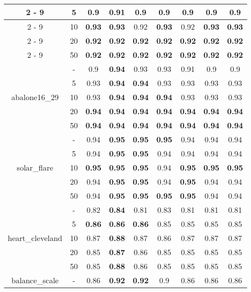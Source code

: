 \documentclass{article}%
\begin{document}
\begin{longtable}{c|c|ccccccc}
\cline{2%
-%
9}%
&5&0.9&\textbf{0.91}&0.9&0.9&0.9&0.9&0.9\\%
\cline{2%
-%
9}%
&10&\textbf{0.93}&\textbf{0.93}&0.92&\textbf{0.93}&0.92&\textbf{0.93}&\textbf{0.93}\\%
\cline{2%
-%
9}%
&20&\textbf{0.92}&\textbf{0.92}&\textbf{0.92}&\textbf{0.92}&\textbf{0.92}&\textbf{0.92}&\textbf{0.92}\\%
\cline{2%
-%
9}%
&50&\textbf{0.92}&\textbf{0.92}&\textbf{0.92}&\textbf{0.92}&\textbf{0.92}&\textbf{0.92}&\textbf{0.92}\\%
\hline%
\multirow{5}{*}{abalone16\_29}&{-}&0.9&\textbf{0.94}&0.93&0.93&0.91&0.9&0.9\\%
\cline{2%
-%
9}%
&5&0.93&\textbf{0.94}&\textbf{0.94}&0.93&0.93&0.93&0.93\\%
\cline{2%
-%
9}%
&10&0.93&\textbf{0.94}&\textbf{0.94}&\textbf{0.94}&0.93&0.93&0.93\\%
\cline{2%
-%
9}%
&20&\textbf{0.94}&\textbf{0.94}&\textbf{0.94}&\textbf{0.94}&\textbf{0.94}&\textbf{0.94}&\textbf{0.94}\\%
\cline{2%
-%
9}%
&50&\textbf{0.94}&\textbf{0.94}&\textbf{0.94}&\textbf{0.94}&\textbf{0.94}&\textbf{0.94}&\textbf{0.94}\\%
\hline%
\multirow{5}{*}{solar\_flare}&{-}&0.94&\textbf{0.95}&\textbf{0.95}&\textbf{0.95}&0.94&0.94&0.94\\%
\cline{2%
-%
9}%
&5&0.94&\textbf{0.95}&\textbf{0.95}&0.94&0.94&0.94&0.94\\%
\cline{2%
-%
9}%
&10&\textbf{0.95}&\textbf{0.95}&\textbf{0.95}&0.94&\textbf{0.95}&\textbf{0.95}&\textbf{0.95}\\%
\cline{2%
-%
9}%
&20&0.94&\textbf{0.95}&\textbf{0.95}&0.94&\textbf{0.95}&0.94&0.94\\%
\cline{2%
-%
9}%
&50&0.94&\textbf{0.95}&\textbf{0.95}&\textbf{0.95}&\textbf{0.95}&0.94&0.94\\%
\hline%
\multirow{5}{*}{heart\_cleveland}&{-}&0.82&\textbf{0.84}&0.81&0.83&0.81&0.81&0.81\\%
\cline{2%
-%
9}%
&5&\textbf{0.86}&\textbf{0.86}&\textbf{0.86}&0.85&0.85&0.85&0.85\\%
\cline{2%
-%
9}%
&10&0.87&\textbf{0.88}&0.87&0.86&0.87&0.87&0.87\\%
\cline{2%
-%
9}%
&20&0.85&\textbf{0.87}&0.86&0.85&0.85&0.85&0.85\\%
\cline{2%
-%
9}%
&50&0.85&\textbf{0.88}&0.86&0.85&0.85&0.85&0.85\\%
\hline%
\multirow{5}{*}{balance\_scale}&{-}&0.86&\textbf{0.92}&\textbf{0.92}&0.9&0.86&0.86&0.86\\%

\end{longtable}
\end{document}
